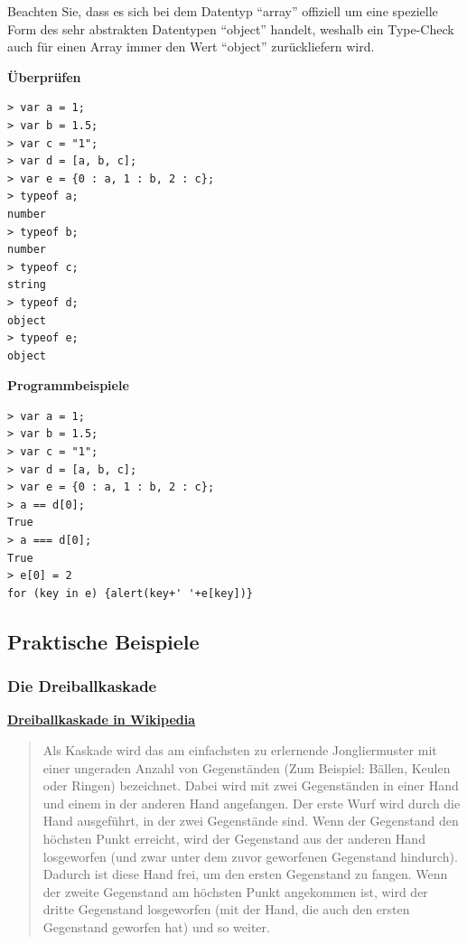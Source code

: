 {Beachten Sie, dass es sich bei dem Datentyp ``array'' offiziell um eine
spezielle Form des sehr abstrakten Datentypen ``object'' handelt,
weshalb ein Type-Check auch für einen Array immer den Wert ``object''
zurückliefern wird.}



\par\noindent\textbf{Überprüfen}

\begin{verbatim}
> var a = 1;
> var b = 1.5;
> var c = "1";
> var d = [a, b, c];
> var e = {0 : a, 1 : b, 2 : c};
> typeof a;
number
> typeof b;
number
> typeof c;
string
> typeof d;
object
> typeof e;
object
\end{verbatim}



\par\noindent\textbf{Programmbeispiele}

\begin{verbatim}
> var a = 1;
> var b = 1.5;
> var c = "1";
> var d = [a, b, c];
> var e = {0 : a, 1 : b, 2 : c};
> a == d[0];
True
> a === d[0];
True
> e[0] = 2
for (key in e) {alert(key+' '+e[key])}
\end{verbatim}

\subsection{\texorpdfstring{{Praktische
Beispiele}}{Praktische Beispiele}}

\subsubsection{\texorpdfstring{{Die
Dreiballkaskade}}{Die Dreiballkaskade}}

\par\noindent\textbf{\href{http://de.wikipedia.org/wiki/Kaskade_(Jonglieren)}{Dreiballkaskade
in Wikipedia}}

\begin{quote}
Als Kaskade wird das am einfachsten zu erlernende Jongliermuster mit
einer ungeraden Anzahl von Gegenständen (Zum Beispiel: Bällen, Keulen
oder Ringen) bezeichnet. Dabei wird mit zwei Gegenständen in einer Hand
und einem in der anderen Hand angefangen. Der erste Wurf wird durch die
Hand ausgeführt, in der zwei Gegenstände sind. Wenn der Gegenstand den
höchsten Punkt erreicht, wird der Gegenstand aus der anderen Hand
losgeworfen (und zwar unter dem zuvor geworfenen Gegenstand hindurch).
Dadurch ist diese Hand frei, um den ersten Gegenstand zu fangen. Wenn
der zweite Gegenstand am höchsten Punkt angekommen ist, wird der dritte
Gegenstand losgeworfen (mit der Hand, die auch den ersten Gegenstand
geworfen hat) und so weiter.
\end{quote}



